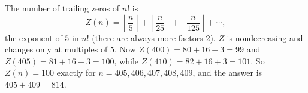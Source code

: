 The number of trailing zeros of $n!$ is
\[
Z(n)=\left\lfloor\dfrac {n}{5}\right\rfloor+\left\lfloor\dfrac {n}{25}\right\rfloor+\left\lfloor\dfrac {n}{125}\right\rfloor+\cdots,
\]
the exponent of $5$ in $n!$ (there are always more factors $2$). $Z$ is nondecreasing and changes only at multiples of $5$. Now $Z(400)=80+16+3=99$ and $Z(405)=81+16+3=100$, while $Z(410)=82+16+3=101$. So $Z(n)=100$ exactly for $n=405,406,407,408,409$, and the answer is $405+409=\boxed{814}$.
